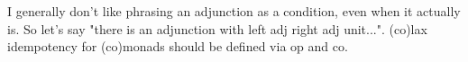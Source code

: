 I generally don't like phrasing an adjunction as a condition,
even when it actually is.
So let's say "there is an adjunction with left adj right adj unit...".
(co)lax idempotency for (co)monads should be defined via op and co.

